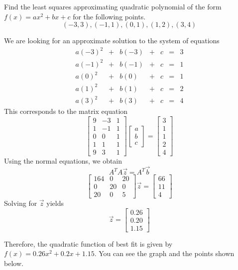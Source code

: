 \documentclass{ximera}
\begin{document}
 \begin{example}\label{ex:leastSquaresPoly}
Find the least squares approximating quadratic polynomial of the form $f(x)=ax^2+bx+c$ for the following points.
$$(-3, 3), (-1, 1), (0, 1), (1, 2), (3, 4)$$

\begin{explanation}
    We are looking for an approximate solution to the system of equations
    $$\begin{matrix}a(-3)^2&+&b(-3)&+&c&=&3\\a(-1)^2&+&b(-1)&+&c&=&1\\a(0)^2&+&b(0)&+&c&=&1\\a(1)^2&+&b(1)&+&c&=&2\\a(3)^2&+&b(3)&+&c&=&4\end{matrix}$$
    This corresponds to the matrix equation
    $$\begin{bmatrix}9&-3&1\\1&-1&1\\0&0&1\\1&1&1\\9&3&1\end{bmatrix}\begin{bmatrix}a\\b\\c\end{bmatrix}=\begin{bmatrix}3\\1\\1\\2\\4\end{bmatrix}$$
    Using the normal equations, we obtain
    $$A^TA\vec{z}=A^T\vec{b}$$
    $$\begin{bmatrix}164&0&20\\0&20&0\\20&0&5\end{bmatrix}\vec{z}=\begin{bmatrix}66\\11\\4\end{bmatrix}$$
    Solving for $\vec{z}$ yields
    $$\vec{z}=\begin{bmatrix}0.26\\0.20\\1.15\end{bmatrix}$$

    Therefore, the quadratic function of best fit is given by $f(x)=0.26x^2+0.2x+1.15$.  You can see the graph and the points shown below.

\begin{onlineOnly}
\begin{center}
\end{center}
\end{onlineOnly}

 
\end{explanation}
 \end{example}
\end{document}

